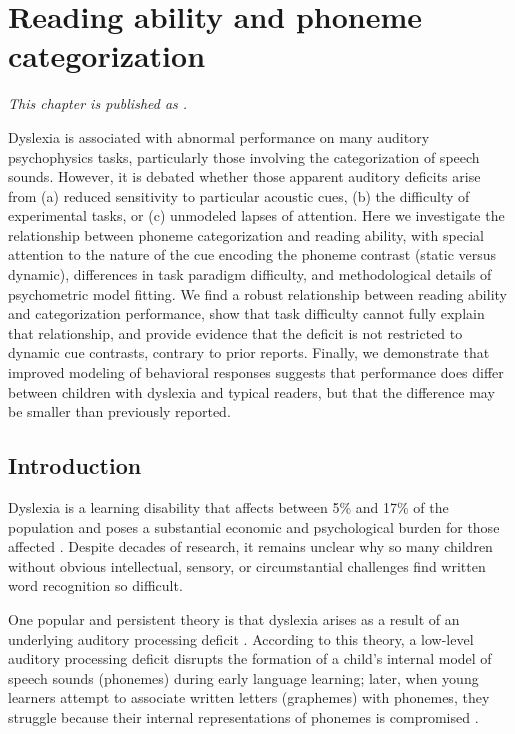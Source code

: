 \documentclass[../uwthesis.tex]{subfiles}
\begin{document}
\chapter{Reading ability and phoneme categorization}
\emph{This chapter is published as \cite{OBrien2018ReadingCategorization}.}

 
Dyslexia is associated with abnormal performance on many auditory psychophysics tasks, particularly those involving the categorization of speech sounds. However, it is debated whether those apparent auditory deficits arise from (a) reduced sensitivity to particular acoustic cues, (b) the difficulty of experimental tasks, or (c) unmodeled lapses of attention. Here we investigate the relationship between phoneme categorization and reading ability, with special attention to the nature of the cue encoding the phoneme contrast (static versus dynamic), differences in task paradigm difficulty, and methodological details of psychometric model fitting. We find a robust relationship between reading ability and categorization performance, show that task difficulty cannot fully explain that relationship, and provide evidence that the deficit is not restricted to dynamic cue contrasts, contrary to prior reports. Finally, we demonstrate that improved modeling of behavioral responses suggests that performance does differ between children with dyslexia and typical readers, but that the difference may be smaller than previously reported.
 
\section{Introduction}

Dyslexia is a learning disability that affects between 5\% and 17\% of the population and poses a substantial economic and psychological burden for those affected \cite{Lyon2003ADyslexia, Shaywitz1998Dyslexia.,Snowling2000DyslexiaEdition}. Despite decades of research, it remains unclear why so many children without obvious intellectual, sensory, or circumstantial challenges find written word recognition so difficult.

One popular and persistent theory is that dyslexia arises as a result of an underlying auditory processing deficit \cite{Farmer1995TheReview,Goswami2011ADyslexia,VanIngelghem2005AnDyslexia,Snowling1998DyslexiaImplications,Steinbrink2014DevelopmentChildren,Tallal1980AuditoryChildren}. According to this theory, a low-level auditory processing deficit disrupts the formation of a child's internal model of speech sounds (phonemes) during early language learning; later, when young learners attempt to associate written letters (graphemes) with phonemes, they struggle because their internal representations of phonemes is compromised \cite{Poelmans2011ReducedDyslexia}. 
\end{document}
